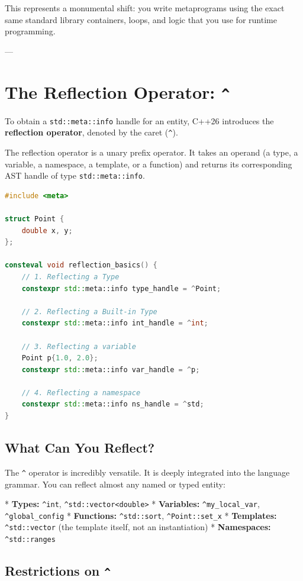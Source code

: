 This represents a monumental shift: you write metaprograms using the exact same standard library containers, loops, and logic that you use for runtime programming.

---

\section{The Reflection Operator: \texttt{^}}

To obtain a \texttt{std::meta::info} handle for an entity, C++26 introduces the \textbf{reflection operator}, denoted by the caret (\texttt{^}).

The reflection operator is a unary prefix operator. It takes an operand (a type, a variable, a namespace, a template, or a function) and returns its corresponding AST handle of type \texttt{std::meta::info}.

\begin{lstlisting}[language=C++]
#include <meta>

struct Point {
    double x, y;
};

consteval void reflection_basics() {
    // 1. Reflecting a Type
    constexpr std::meta::info type_handle = ^Point;
    
    // 2. Reflecting a Built-in Type
    constexpr std::meta::info int_handle = ^int;
    
    // 3. Reflecting a variable
    Point p{1.0, 2.0};
    constexpr std::meta::info var_handle = ^p;
    
    // 4. Reflecting a namespace
    constexpr std::meta::info ns_handle = ^std;
}
\end{lstlisting}

\subsection{What Can You Reflect?}

The \texttt{^} operator is incredibly versatile. It is deeply integrated into the language grammar. You can reflect almost any named or typed entity:

*   \textbf{Types:} \texttt{^int}, \texttt{^std::vector<double>}
*   \textbf{Variables:} \texttt{^my_local_var}, \texttt{^global_config}
*   \textbf{Functions:} \texttt{^std::sort}, \texttt{^Point::set_x}
*   \textbf{Templates:} \texttt{^std::vector} (the template itself, not an instantiation)
*   \textbf{Namespaces:} \texttt{^std::ranges}

\subsection{Restrictions on \texttt{^}}

